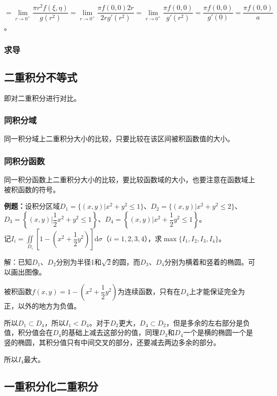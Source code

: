 \documentclass[UTF8, 12pt]{ctexart}
\begin{document}
$=\lim\limits_{r\to0^+}\dfrac{\pi r^2f(\xi,\eta)}{g(r^2)}=\lim\limits_{r\to0^+}\dfrac{\pi f(0,0)2r}{2rg'(r^2)}=\lim\limits_{r\to0^+}\dfrac{\pi f(0,0)}{g'(r^2)}=\dfrac{\pi f(0,0)}{g'(0)}=\dfrac{\pi f(0,0)}{a}$。

\subsubsection{求导}

\subsection{二重积分不等式}

即对二重积分进行对比。

\subsubsection{同积分域}

同一积分域上二重积分大小的比较，只要比较在该区间被积函数值的大小。

\subsubsection{同积分函数}

同一积分函数上二重积分大小的比较，要比较函数域的大小，也要注意在函数域上被积函数的符号。

\textbf{例题：}设积分区域$D_1=\{(x,y)|x^2+y^2\leqslant1\}$、$D_2=\{(x,y)|x^2+y^2\leqslant2\}$、$D_3=\left\{(x,y)|\dfrac{1}{2}x^2+y^2\leqslant1\right\}$、$D_4=\left\{(x,y)|x^2+\dfrac{1}{2}y^2\leqslant1\right\}$。\\记$I_i=\iint\limits_{D_i}\left[1-\left(x^2+\dfrac{1}{2}y^2\right)\right]\textrm{d}\sigma$（$i=1,2,3,4$），求$\max\{I_1,I_2,I_3,I_4\}$。

解：已知$D_1$、$D_2$分别为半径1和$\sqrt{2}$的圆，而$D_3$、$D_4$分别为横着和竖着的椭圆。可以画出图像。

被积函数$f(x,y)=1-\left(x^2+\dfrac{1}{2}y^2\right)$为连续函数，只有在$D_4$上才能保证完全为正，以外的地方为负值。

所以$D_1\subset D_4$，所以$I_1<D_4$。对于$D_2$更大，$D_4\subset D_2$，但是多余的左右部分是负值，积分值会在$D_4$的基础上减去这部分的值，同理$D_3$和$D_4$一个是横的椭圆一个是竖的椭圆，其积分值只有中间交叉的部分，还要减去两边多余的部分。

所以$I_4$最大。

\subsection{一重积分化二重积分}
\end{document}
